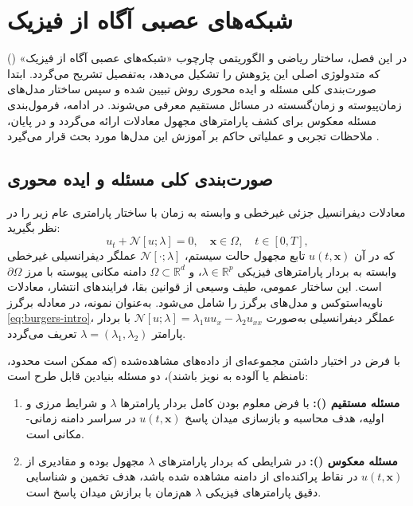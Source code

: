 \chapter{شبکه‌های عصبی آگاه از فیزیک}
\label{ch:method}

در این فصل، ساختار ریاضی و الگوریتمی چارچوب «شبکه‌های عصبی آگاه از فیزیک» () که متدولوژی اصلی این پژوهش را تشکیل می‌دهد، به‌تفصیل تشریح می‌گردد. ابتدا صورت‌بندی کلی مسئله و ایده محوری روش تبیین شده و سپس ساختار مدل‌های زمان‌پیوسته و زمان‌گسسته در مسائل مستقیم معرفی می‌شوند. در ادامه، فرمول‌بندی مسئله معکوس برای کشف پارامترهای مجهول معادلات ارائه می‌گردد و در پایان، ملاحظات تجربی و عملیاتی حاکم بر آموزش این مدل‌ها مورد بحث قرار می‌گیرد \cite{raissi2019}.

\section{صورت‌بندی کلی مسئله و ایده محوری}
\label{sec:formulation}

معادلات دیفرانسیل جزئی غیرخطی و وابسته به زمان با ساختار پارامتری عام زیر را در نظر بگیرید:
\begin{equation}
u_t + \mathcal{N}[u; \lambda] = 0, \quad \mathbf{x} \in \Omega, \quad t \in [0,T],
\label{eq:general-pde}
\end{equation}
که در آن $u(t,\mathbf{x})$ تابع مجهول حالت سیستم، $\mathcal{N}[\cdot; \lambda]$ عملگر دیفرانسیلی غیرخطی وابسته به بردار پارامترهای فیزیکی $\lambda \in \mathbb{R}^p$، و $\Omega \subset \mathbb{R}^d$ دامنه مکانی پیوسته با مرز $\partial\Omega$ است. این ساختار عمومی، طیف وسیعی از قوانین بقا، فرایندهای انتشار، معادلات ناویه‌استوکس و مدل‌های برگرز را شامل می‌شود. به‌عنوان نمونه، در معادله برگرز \eqref{eq:burgers-intro}، عملگر دیفرانسیلی به‌صورت $\mathcal{N}[u;\lambda] = \lambda_1 u u_x - \lambda_2 u_{xx}$ با بردار پارامتر $\lambda = (\lambda_1, \lambda_2)$ تعریف می‌گردد.

با فرض در اختیار داشتن مجموعه‌ای از داده‌های مشاهده‌شده (که ممکن است محدود، نامنظم یا آلوده به نویز باشند)، دو مسئله بنیادین قابل طرح است:
\begin{enumerate}
\item \textbf{مسئله مستقیم ():} با فرض معلوم بودن کامل بردار پارامترها $\lambda$ و شرایط مرزی و اولیه، هدف محاسبه و بازسازی میدان پاسخ $u(t,\mathbf{x})$ در سراسر دامنه زمانی-مکانی است.
\item \textbf{مسئله معکوس ():} در شرایطی که بردار پارامترهای $\lambda$ مجهول بوده و مقادیری از $u(t,\mathbf{x})$ در نقاط پراکنده‌ای از دامنه مشاهده شده باشد، هدف تخمین و شناسایی دقیق پارامترهای فیزیکی $\lambda$ هم‌زمان با برازش میدان پاسخ است.
\end{enumerate}

